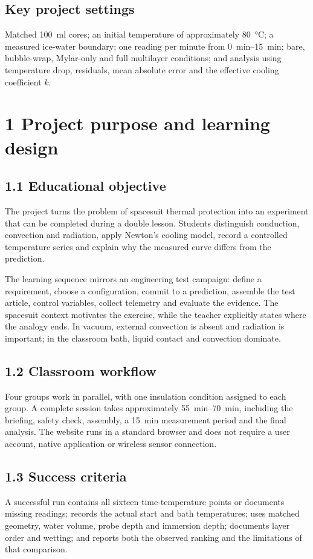 \documentclass[9pt,a4paper]{extarticle}
\begin{document}
\subsection*{Key project settings}
Matched \SI{100}{\milli\litre} cores; an initial temperature of approximately \SI{80}{\celsius}; a measured ice-water boundary; one reading per minute from \SIrange{0}{15}{\minute}; bare, bubble-wrap, Mylar-only and full multilayer conditions; and analysis using temperature drop, residuals, mean absolute error and the effective cooling coefficient $k$.

\section*{1 Project purpose and learning design}
\subsection*{1.1 Educational objective}
The project turns the problem of spacesuit thermal protection into an experiment that can be completed during a double lesson. Students distinguish conduction, convection and radiation, apply Newton's cooling model, record a controlled temperature series and explain why the measured curve differs from the prediction.

The learning sequence mirrors an engineering test campaign: define a requirement, choose a configuration, commit to a prediction, assemble the test article, control variables, collect telemetry and evaluate the evidence. The spacesuit context motivates the exercise, while the teacher explicitly states where the analogy ends. In vacuum, external convection is absent and radiation is important; in the classroom bath, liquid contact and convection dominate.

\subsection*{1.2 Classroom workflow}
Four groups work in parallel, with one insulation condition assigned to each group. A complete session takes approximately \SIrange{55}{70}{\minute}, including the briefing, safety check, assembly, a \SI{15}{\minute} measurement period and the final analysis. The website runs in a standard browser and does not require a user account, native application or wireless sensor connection.

\subsection*{1.3 Success criteria}
A successful run contains all sixteen time-temperature points or documents missing readings; records the actual start and bath temperatures; uses matched geometry, water volume, probe depth and immersion depth; documents layer order and wetting; and reports both the observed ranking and the limitations of that comparison.
\end{document}
